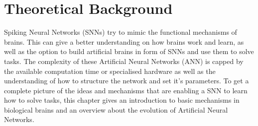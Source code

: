 
\chapter{Theoretical Background}\label{chapter:theoreticalBackground}
Spiking Neural Networks (SNNs) try to mimic the functional mechanisms of brains. This can give a better understanding on how brains work and learn, as well as the option to build artificial brains in form of SNNs and use them to solve tasks. The complexity of these Artificial Neural Networks (ANN) is capped by the available computation time or specialised hardware as well as the understanding of how to structure the network and set it’s parameters. To get a complete picture of the ideas and mechanisms that are enabling a SNN to learn how to solve tasks, this chapter gives an introduction to basic mechanisms in biological brains and an overview about the evolution of Artificial Neural Networks.
